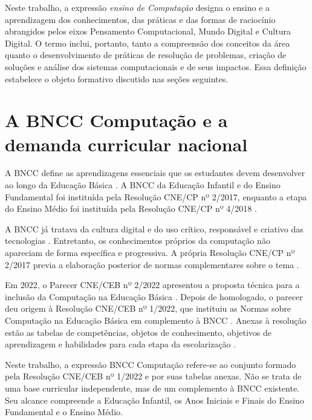 Neste trabalho, a expressão \textit{ensino de Computação} designa o ensino e a aprendizagem dos conhecimentos, das práticas e das formas de raciocínio abrangidos pelos eixos Pensamento Computacional, Mundo Digital e Cultura Digital. O termo inclui, portanto, tanto a compreensão dos conceitos da área quanto o desenvolvimento de práticas de resolução de problemas, criação de soluções e análise dos sistemas computacionais e de seus impactos. Essa definição estabelece o objeto formativo discutido nas seções seguintes.

\section{A BNCC Computação e a demanda curricular nacional}
\label{sec:bncc-computacao}


A BNCC define as aprendizagens essenciais que os estudantes devem desenvolver ao longo da Educação Básica \cite{brasil2018bncc}. A BNCC da Educação Infantil e do Ensino Fundamental foi instituída pela Resolução CNE/CP nº 2/2017, enquanto a etapa do Ensino Médio foi instituída pela Resolução CNE/CP nº 4/2018 \cite{brasil2017bncc,brasil2018bnccem}.

A BNCC já tratava da cultura digital e do uso crítico, responsável e criativo das tecnologias \cite{brasil2018bncc}. Entretanto, os conhecimentos próprios da computação não apareciam de forma específica e progressiva. A própria Resolução CNE/CP nº 2/2017 previa a elaboração posterior de normas complementares sobre o tema \cite{brasil2017bncc}.

Em 2022, o Parecer CNE/CEB nº 2/2022 apresentou a proposta técnica para a inclusão da Computação na Educação Básica \cite{brasil2022parecercomputacao2}. Depois de homologado, o parecer deu origem à Resolução CNE/CEB nº 1/2022, que instituiu as Normas sobre Computação na Educação Básica em complemento à BNCC \cite{brasil2022resolucao1}. Anexas à resolução estão as tabelas de competências, objetos de conhecimento, objetivos de aprendizagem e habilidades para cada etapa da escolarização \cite{brasil2022bncccomputacao}.

Neste trabalho, a expressão BNCC Computação refere-se ao conjunto formado pela Resolução CNE/CEB nº 1/2022 e por suas tabelas anexas. Não se trata de uma base curricular independente, mas de um complemento à BNCC existente. Seu alcance compreende a Educação Infantil, os Anos Iniciais e Finais do Ensino Fundamental e o Ensino Médio.


